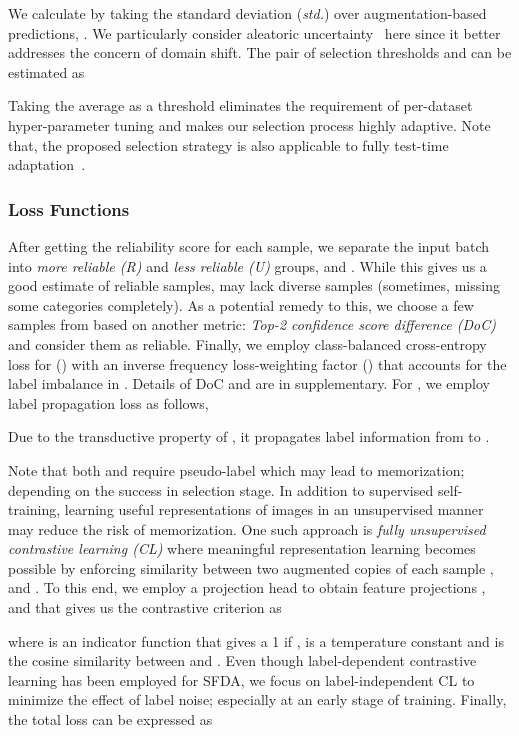\documentclass[10pt,twocolumn,letterpaper]{article}
\begin{document}
We calculate  by taking the standard deviation (\textit{std.}) over augmentation-based predictions, . We particularly consider aleatoric uncertainty~\cite{hullermeier2021aleatoric} here since it better addresses the concern of domain shift. The pair of selection thresholds  and  can be estimated as 

Taking the average as a threshold eliminates the requirement of per-dataset hyper-parameter tuning and makes our selection process highly adaptive. Note that, the proposed selection strategy is also applicable to fully test-time adaptation~\cite{wang2021tent,chen2022contrastive}. 
\vspace{-2mm}
\subsubsection{Loss Functions}
\vspace{-1mm}
After getting the reliability score for each sample, we separate the input batch  into \emph{more reliable (R)} and \emph{less reliable (U)} groups,  and . While this gives us a good estimate of reliable samples,  may lack diverse samples (sometimes, missing some categories completely). As a potential remedy to this, we choose a few samples from  based on another metric: \emph{Top-2 confidence score difference (DoC)} and consider them as reliable. Finally, we employ class-balanced cross-entropy loss for  () with an inverse frequency loss-weighting factor () that accounts for the label imbalance in . Details of DoC and  are in supplementary. For , we employ label propagation loss\cite{zhou2003learning} as follows,

Due to the transductive property of , it propagates label information from  to . 

Note that both  and 
 require pseudo-label which may lead to memorization; depending on the success in selection stage. In addition to supervised self-training, learning useful representations of images in an unsupervised manner may reduce the risk of memorization. One such approach is \emph{fully unsupervised contrastive learning (CL)} where meaningful representation learning becomes possible by enforcing similarity between two augmented copies of each sample ,  and . To this end, we employ a projection head  to obtain feature projections , and  that gives us the contrastive criterion \cite{chen2020simple,khosla2020supervised} as

where  is an indicator function that gives a 1 if ,  is a temperature constant and  is the cosine similarity between  and . Even though label-dependent contrastive learning has been employed for SFDA\cite{chen2022contrastive}, we focus on label-independent CL to minimize the effect of label noise; especially at an early stage of training. Finally, the total loss can be expressed as 
\end{document}
